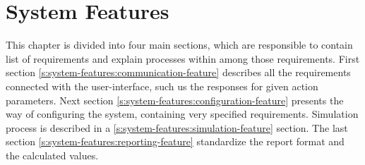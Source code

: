 \chapter{System Features} \label{chp:system-features}
	\begin{comment}
		$<$This template illustrates organizing the functional requirements for the 
		product by system features, the major services provided by the product. You may 
		prefer to organize this section by use case, mode of operation, user class, 
		object class, functional hierarchy, or combinations of these, whatever makes the 
		most logical sense for your product.$>$
	\end{comment}
	This chapter is divided into four main sections, which are responsible to contain list of requirements and explain processes within among those requirements. First section \ref{s:system-features:communication-feature} describes all the requirements connected with the user-interface, such us the responses for given action parameters. Next section \ref{s:system-features:configuration-feature} presents the way of configuring the system, containing very specified requirements. Simulation process is described in a \ref{s:system-features:simulation-feature} section. The last section \ref{s:system-features:reporting-feature} standardize the report format and the calculated values.
	
	
		
	
	